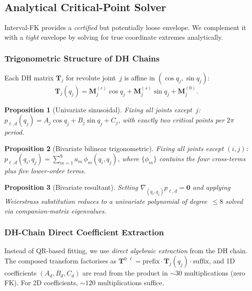 \documentclass[journal]{IEEEtran}
\newtheorem{proposition}{Proposition}
\newcommand{\bT}{\mathbf{T}}
\begin{document}
\subsection{Analytical Critical-Point Solver}\label{sec:critical}

Interval-FK provides a \emph{certified} but potentially loose envelope.
We complement it with a \emph{tight} envelope by solving for true
coordinate extremes analytically.

\subsubsection{Trigonometric Structure of DH Chains}

Each DH matrix $\bT_j$ for revolute joint~$j$ is affine in
$(\cos q_j, \sin q_j)$:
\begin{equation}\label{eq:dh_affine}
  \bT_j(q_j) = \bm{M}_j^{(c)}\cos q_j + \bm{M}_j^{(s)}\sin q_j
  + \bm{M}_j^{(0)}.
\end{equation}

\begin{proposition}[Univariate sinusoidal]\label{prop:sinusoid}
Fixing all joints except~$j$:
$p_{\ell,d}(q_j) = A_j\cos q_j + B_j\sin q_j + C_j$,
with exactly two critical points per $2\pi$ period.
\end{proposition}

\begin{proposition}[Bivariate bilinear trigonometric]\label{prop:bilinear}
Fixing all joints except $(i,j)$:
$p_{\ell,d}(q_i,q_j) = \sum_{m=1}^{9} a_m\,\phi_m(q_i,q_j)$,
where $\{\phi_m\}$ contains the four cross-terms plus five
lower-order terms.
\end{proposition}

\begin{proposition}[Bivariate resultant]\label{prop:resultant}
Setting $\nabla_{(q_i,q_j)} p_{\ell,d} = \bm{0}$ and applying
Weierstrass substitution reduces to a univariate polynomial of
degree~$\leq 8$ solved via companion-matrix eigenvalues.
\end{proposition}

\subsubsection{DH-Chain Direct Coefficient Extraction}\label{sec:dh_coeff}

Instead of QR-based fitting, we use \emph{direct algebraic extraction}
from the DH chain.
The composed transform factorises as
$\bT^{0:\ell} = \text{prefix} \cdot \bT_j(q_j) \cdot \text{suffix}$,
and 1D coefficients $(A_d, B_d, C_d)$ are read from the product in
${\sim}30$ multiplications (zero FK).
For 2D coefficients, ${\sim}120$ multiplications suffice.
\end{document}
